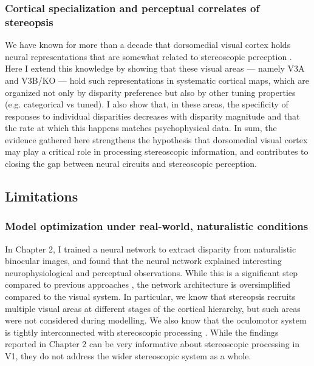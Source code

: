 \subsubsection*{Cortical specialization and perceptual correlates of stereopsis}

We have known for more than a decade that dorsomedial visual cortex holds neural representations that are somewhat related to stereoscopic perception \cite{Backus:2001ly,Tsao:2003lk}. Here I extend this knowledge by showing that these visual areas --- namely V3A and V3B/KO --- hold such representations in systematic cortical maps, which are organized not only by disparity preference but also by other tuning properties (e.g. categorical vs tuned). I also show that, in these areas, the specificity of responses to individual disparities decreases with disparity magnitude and that the rate at which this happens matches psychophysical data. In sum, the evidence gathered here strengthens the hypothesis that dorsomedial visual cortex may play a critical role in processing stereoscopic information, and contributes to closing the gap between neural circuits and stereoscopic perception.


\subsection{Limitations}


\subsubsection*{Model optimization under real-world, naturalistic conditions}

In Chapter 2, I trained a neural network to extract disparity from naturalistic binocular images, and found that the neural network explained interesting neurophysiological and perceptual observations. While this is a significant step compared to previous approaches \cite{Lippert:2000fk,Lippert:2001fk}, the network architecture is oversimplified compared to the visual system. In particular, we know that stereopsis recruits multiple visual areas at different stages of the cortical hierarchy, but such areas were not considered during modelling. We also know that the oculomotor system is tightly interconnected with stereoscopic processing \cite{Masson:1997jq,Masson:2002qi}. While the findings reported in Chapter 2 can be very informative about stereoscopic processing in V1, they do not address the wider stereoscopic system as a whole.  

